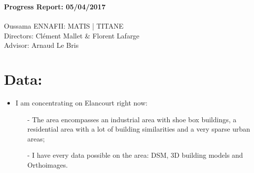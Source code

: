 \documentclass[a4paper, 11pt]{article}
\begin{document}
	\begin{centering}
		\large\textbf{Progress Report: 05/04/2017}\\
		~\\
		Oussama ENNAFII:
		\normalsize MATIS | TITANE \\
		Directors: Cl\'ement Mallet \& Florent Lafarge \\
		Advisor: Arnaud Le Bris \\		
	\end{centering} 


	\section*{Data:}
	
	\begin{itemize}
		\item I am concentrating on Elancourt right now:
		\begin{itemize}
			\item[-] The area encompasses an industrial area with shoe box buildings, a residential area with a lot of building similarities and a very sparse urban areas;
			\item[-] I have every data possible on the area: DSM, 3D building models and Orthoimages.
		\end{itemize}
	\end{itemize}
	
\end{document}
